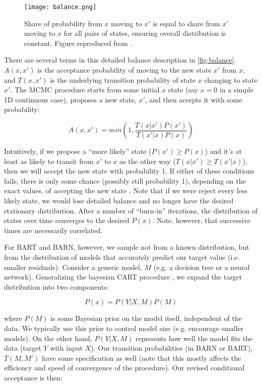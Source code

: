 \documentclass[12pt]{article}
\begin{document}
\begin{figure}[htb]
\centering
    \texttt{[image: balance.png]}
    \caption{Share of probability from $x$ moving to $x'$ is equal to share from $x'$ moving to $x$ for all pairs of states, ensuring overall distribution is constant.  Figure reproduced from \cite{stepanov2021math}.}
    \label{fig:balance}
\end{figure}

There are several terms in this detailed balance description in \autoref{fig:balance}.  $A(x,x')$ is the acceptance probability of moving to the new state $x'$ from $x$, and $T(x,x')$ is the underlying transition probability of state $x$ changing to state $x'$.  The MCMC procedure starts from some initial $x$ state (say $x=0$ in a simple 1D continuous case), proposes a new state, $x'$, and then accepts it with some probability:

$$
A(x,x') = min(1, \frac{T(x|x') P(x')}{T(x'|x) P(x)})
$$

Intuitively, if we propose a ``more likely'' state ($P(x') \geq P(x)$) and it's at least as likely to transit from $x'$ to $x$ as the other way ($T(x|x') \geq T(x'|x)$), then we will accept the new state with probability 1.  If either of these conditions fails, there is only some chance (possibly still probability 1), depending on the exact values, of accepting the new state \cite{stepanov2021math}.  Note that if we were reject every less likely state, we would lose detailed balance and no longer have the desired stationary distribution.  After a number of ``burn-in'' iterations, the distribution of states over time converges to the desired $P(x)$.  Note, however, that successive times are necessarily correlated.



For BART and BARN, however, we sample not from a known distribution, but from the distribution of models that accurately predict our target value (i.e. smaller residuals).  Consider a generic model, $M$ (e.g. a decision tree or a neural network).  Generalizing the bayesian CART procedure \cite{chipman1998bayesian}, we expand the target distribution into two components: 

$$
P(x) = P(Y|X,M) P(M)
$$

where $P(M)$ is some Bayesian prior on the model itself, independent of the data.  We typically use this prior to control model size (e.g. encourage smaller models).  On the other hand, $P(Y|X,M)$ represents how well the model fits the data (target $Y$ with input $X$).  Our transition probabilities (in BARN or BART), $T(M,M')$ have some specification as well (note that this mostly affects the efficiency and speed of convergence of the procedure).  Our revised conditional acceptance is then:
\end{document}
